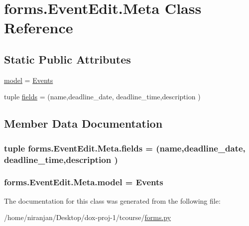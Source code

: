 \hypertarget{classforms_1_1_event_edit_1_1_meta}{}\section{forms.\+Event\+Edit.\+Meta Class Reference}
\label{classforms_1_1_event_edit_1_1_meta}
\subsection*{Static Public Attributes}
\begin{DoxyCompactItemize}
\item 
\hyperlink{classforms_1_1_event_edit_1_1_meta_a9d8e3fd516c760ce6ddebc2422fed6dd}{model} = \hyperlink{classmodels_1_1_events}{Events}
\item 
tuple \hyperlink{classforms_1_1_event_edit_1_1_meta_a1af194246ca06c1e24faa1682a8d6fb1}{fields} = (\textquotesingle{}name\textquotesingle{},\textquotesingle{}deadline\+\_\+date\textquotesingle{}, \textquotesingle{}deadline\+\_\+time\textquotesingle{},\textquotesingle{}description\textquotesingle{} )
\end{DoxyCompactItemize}


\subsection{Member Data Documentation}
\subsubsection[{\texorpdfstring{fields}{fields}}]{\setlength{\rightskip}{0pt plus 5cm}tuple forms.\+Event\+Edit.\+Meta.\+fields = (\textquotesingle{}name\textquotesingle{},\textquotesingle{}deadline\+\_\+date\textquotesingle{}, \textquotesingle{}deadline\+\_\+time\textquotesingle{},\textquotesingle{}description\textquotesingle{} )\hspace{0.3cm}{\ttfamily [static]}}\hypertarget{classforms_1_1_event_edit_1_1_meta_a1af194246ca06c1e24faa1682a8d6fb1}{}\label{classforms_1_1_event_edit_1_1_meta_a1af194246ca06c1e24faa1682a8d6fb1}
\subsubsection[{\texorpdfstring{model}{model}}]{\setlength{\rightskip}{0pt plus 5cm}forms.\+Event\+Edit.\+Meta.\+model = {\bf Events}\hspace{0.3cm}{\ttfamily [static]}}\hypertarget{classforms_1_1_event_edit_1_1_meta_a9d8e3fd516c760ce6ddebc2422fed6dd}{}\label{classforms_1_1_event_edit_1_1_meta_a9d8e3fd516c760ce6ddebc2422fed6dd}


The documentation for this class was generated from the following file\+:\begin{DoxyCompactItemize}
\item 
/home/niranjan/\+Desktop/dox-\/proj-\/1/tcourse/\hyperlink{forms_8py}{forms.\+py}\end{DoxyCompactItemize}
